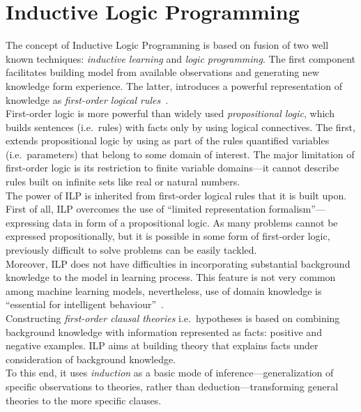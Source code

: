 \documentclass[12pt, a4paper, pdflatex, leqno, twoside]{report}
\begin{document}
\section{Inductive Logic Programming}
The concept of Inductive Logic Programming is based on fusion of two well known techniques: \emph{inductive learning} and \emph{logic programming}. The first component facilitates building model from available observations and generating new knowledge form experience. The latter, introduces a powerful representation of knowledge as \emph{first-order logical rules}~\citep{muggleton1994inductive,muggleton1995inverse}.\\

First-order logic is more powerful than widely used \emph{propositional logic}, which builds sentences (i.e.\ rules) with facts only by using logical connectives. The first, extends propositional logic by using as part of the rules quantified variables (i.e.\ parameters) that belong to some domain of interest. The major limitation of first-order logic is its restriction to finite variable domains---it cannot describe rules built on infinite sets like real or natural numbers.\\ %

The power of ILP is inherited from first-order logical rules that it is built upon. First of all, ILP overcomes the use of ``limited representation formalism''---expressing data in form of a propositional logic. As many problems cannot be expressed propositionally, but it is possible in some form of first-order logic, previously difficult to solve problems can be easily tackled.\\
Moreover, ILP does not have difficulties in incorporating substantial background knowledge to the model in learning process. This feature is not very common among machine learning models, nevertheless, use of domain knowledge is ``essential for intelligent behaviour''~\citep{muggleton1994inductive}.\\

Constructing \emph{first-order clausal theories} i.e.\ hypotheses is based on combining background knowledge with information represented as facts: positive and negative examples. ILP aims at building theory that explains facts under consideration of background knowledge.\\
To this end, it uses \emph{induction} as a basic mode of inference---generalization of specific observations to theories, rather than deduction---transforming general theories to the more specific clauses.\\
\end{document}
